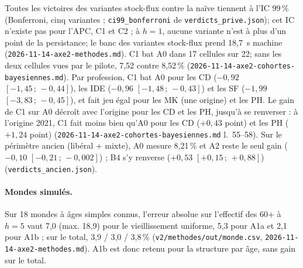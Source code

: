 Toutes les victoires des variantes stock-flux contre la naïve tiennent à l'IC 99\,\% (Bonferroni, cinq
variantes ; \texttt{ci99\_bonferroni} de \texttt{verdicts\_prive.json})\mesure ; cet IC n'existe pas pour
l'APC, C1 et C2 ; à $h = 1$,
aucune variante n'est à plus d'un point de la persistance\mesure ; le banc des variantes stock-flux prend
18,7\mesure{}~s machine (\texttt{2026-11-14-axe2-methodes.md}). C1 bat A0 dans 17 cellules sur
22\mesure ; sans les deux cellules vues par le pilote, 7,52 contre 8,52\,\%\mesure
(\texttt{2026-11-14-axe2-cohortes-bayesiennes.md}). Par profession, C1 bat A0 pour les CD
($-0{,}92$ $[-1{,}45\,;\,-0{,}44]$\mesure), les IDE ($-0{,}96$ $[-1{,}48\,;\,-0{,}43]$\mesure) et les SF
($-1{,}99$ $[-3{,}83\,;\,-0{,}45]$\mesure), et fait jeu égal pour les MK (une origine) et les PH. Le gain de
C1 sur A0 décroît avec l'origine pour les CD et les PH, jusqu'à se renverser : à l'origine 2021, C1 fait
moins bien qu'A0 pour les CD ($+0{,}43$\mesure{} point) et les PH ($+1{,}24$\mesure{} point)
(\texttt{2026-11-14-axe2-cohortes-bayesiennes.md} l.~55--58). Sur le périmètre ancien (libéral + mixte), A0 mesure 8,21\,\%\mesure{} et A2 reste le seul gain
($-0{,}10$ $[-0{,}21\,;\,-0{,}002]$\mesure) ; B4 s'y renverse ($+0{,}53$ $[+0{,}15\,;\,+0{,}88]$\mesure)
(\texttt{verdicts\_ancien.json}).

\paragraph{Mondes simulés.} Sur 18 mondes à âges simples connus\suppose, l'erreur absolue sur l'effectif
des 60+ à $h = 5$ vaut 7,0\mesure{} (max. 18,9) pour le vieillissement uniforme, 5,3\mesure{} pour A1a et
2,1\mesure{} pour A1b ; sur le total, 3,9 / 3,0 / 3,8\,\%\mesure{} (\texttt{v2/methodes/out/monde.csv},
\texttt{2026-11-14-axe2-methodes.md}). A1b est donc retenu pour la structure par âge, sans gain sur le
total.

